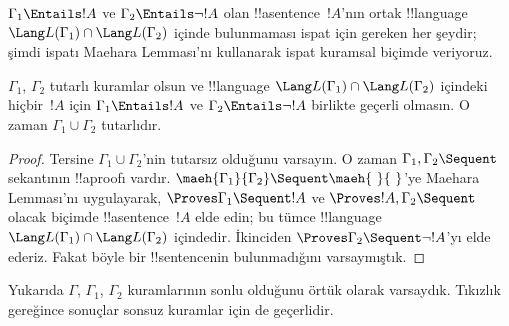 \documentclass[../../../include/open-logic-section]{subfiles}
\begin{document}
$\Gamma_1 \Entails !A$ ve $\Gamma_2 \Entails \lnot !A$ olan
!!a{sentence}~$!A$'nın ortak !!{language}~$\Lang L(\Gamma_1) \cap \Lang
L(\Gamma_2)$ içinde bulunmaması ispat için gereken her şeydir; şimdi ispatı
Maehara Lemması'nı kullanarak ispat kuramsal biçimde veriyoruz.

\begin{thm}
$\Gamma_1$, $\Gamma_2$ tutarlı kuramlar olsun ve !!{language} $\Lang
L(\Gamma_1) \cap \Lang L(\Gamma_2)$ içindeki hiçbir~$!A$ için $\Gamma_1
\Entails !A$ ve $\Gamma_2 \Entails \lnot !A$ birlikte geçerli olmasın. O
zaman $\Gamma_1 \cup \Gamma_2$ tutarlıdır.
\end{thm}

\begin{proof}
  Tersine $\Gamma_1 \cup \Gamma_2$'nin tutarsız olduğunu varsayın. O zaman
  $\Gamma_1, \Gamma_2 \Sequent \ $ sekantının !!a{proof}{}ı vardır.
  $\maeh{\Gamma_1}{\Gamma_2} \Sequent \maeh{\ }{\ }$'ye Maehara Lemması'nı
  uygulayarak, $\Proves \Gamma_1 \Sequent !A$ ve $\Proves !A, \Gamma_2
  \Sequent \quad$ olacak biçimde !!a{sentence}~$!A$ elde edin; bu tümce
  !!{language}~$\Lang L(\Gamma_1) \cap \Lang L(\Gamma_2)$ içindedir.
  İkinciden $\Proves
  \Gamma_2 \Sequent \lnot !A$'yı elde ederiz. Fakat böyle bir
  !!{sentence}{}nin bulunmadığını varsaymıştık.
\end{proof}

Yukarıda $\Gamma$, $\Gamma_1$, $\Gamma_2$ kuramlarının sonlu olduğunu
örtük olarak varsaydık. Tıkızlık gereğince sonuçlar sonsuz kuramlar için de
geçerlidir.
\end{document}

